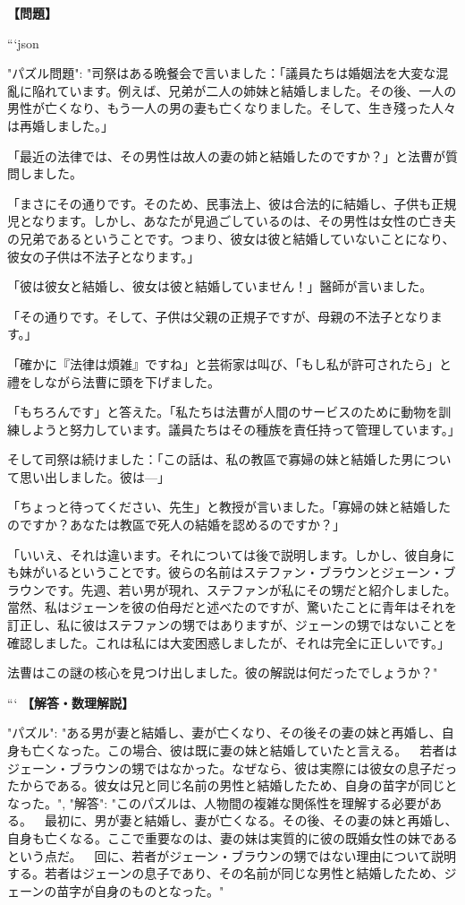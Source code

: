 \documentclass[10pt,a4paper,oneside,openany]{ltjsbook}
\begin{document}
\begin{tcolorbox}[colback=softblue,colframe=primaryblue,title=\textbf{第 52 問：QUEER RELATIONSHIPS.},arc=2mm,boxrule=1pt,breakable]
\textbf{【問題】}\par\vspace{0.3em}

```json
{
  "パズル問題": "司祭はある晩餐会で言いました：「議員たちは婚姻法を大変な混亂に陥れています。例えば、兄弟が二人の姉妹と結婚しました。その後、一人の男性が亡くなり、もう一人の男の妻も亡くなりました。そして、生き殘った人々は再婚しました。」

「最近の法律では、その男性は故人の妻の姉と結婚したのですか？」と法曹が質問しました。

「まさにその通りです。そのため、民事法上、彼は合法的に結婚し、子供も正規児となります。しかし、あなたが見過ごしているのは、その男性は女性の亡き夫の兄弟であるということです。つまり、彼女は彼と結婚していないことになり、彼女の子供は不法子となります。」

「彼は彼女と結婚し、彼女は彼と結婚していません！」醫師が言いました。

「その通りです。そして、子供は父親の正規子ですが、母親の不法子となります。」

「確かに『法律は煩雑』ですね」と芸術家は叫び、「もし私が許可されたら」と禮をしながら法曹に頭を下げました。

「もちろんです」と答えた。「私たちは法曹が人間のサービスのために動物を訓練しようと努力しています。議員たちはその種族を責任持って管理しています。」

そして司祭は続けました：「この話は、私の教區で寡婦の妹と結婚した男について思い出しました。彼は—」

「ちょっと待ってください、先生」と教授が言いました。「寡婦の妹と結婚したのですか？あなたは教區で死人の結婚を認めるのですか？」

「いいえ、それは違います。それについては後で説明します。しかし、彼自身にも妹がいるということです。彼らの名前はステファン・ブラウンとジェーン・ブラウンです。先週、若い男が現れ、ステファンが私にその甥だと紹介しました。當然、私はジェーンを彼の伯母だと述べたのですが、驚いたことに青年はそれを訂正し、私に彼はステファンの甥ではありますが、ジェーンの甥ではないことを確認しました。これは私には大変困惑しましたが、それは完全に正しいです。」

法曹はこの謎の核心を見つけ出しました。彼の解説は何だったでしょうか？"
}
```
\tcblower
\textbf{【解答・数理解説】}\par\vspace{0.3em}
{
"パズル": "ある男が妻と結婚し、妻が亡くなり、その後その妻の妹と再婚し、自身も亡くなった。この場合、彼は既に妻の妹と結婚していたと言える。\
\
若者はジェーン・ブラウンの甥ではなかった。なぜなら、彼は実際には彼女の息子だったからである。彼女は兄と同じ名前の男性と結婚したため、自身の苗字が同じとなった。",
"解答": "このパズルは、人物間の複雑な関係性を理解する必要がある。\
\
最初に、男が妻と結婚し、妻が亡くなる。その後、その妻の妹と再婚し、自身も亡くなる。ここで重要なのは、妻の妹は実質的に彼の既婚女性の妹であるという点だ。\
\
回に、若者がジェーン・ブラウンの甥ではない理由について説明する。若者はジェーンの息子であり、その名前が同じな男性と結婚したため、ジェーンの苗字が自身のものとなった。"
}
\end{tcolorbox}
\end{document}
